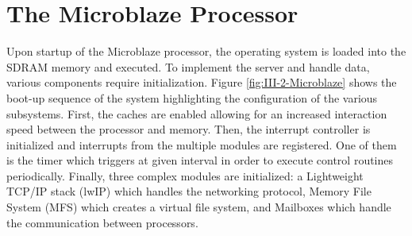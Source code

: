   \section{The Microblaze Processor}

    Upon startup of the Microblaze processor, the operating system is loaded into the SDRAM memory and executed. To implement the server and handle data, various components require initialization. Figure \ref{fig:III-2-Microblaze} shows the boot-up sequence of the system highlighting the configuration of the various subsystems. First, the caches are enabled allowing for an increased interaction speed between the processor and memory. Then, the interrupt controller is initialized and interrupts from the multiple modules are registered. One of them is the timer which triggers at given interval in order to execute control routines periodically. Finally, three complex modules are initialized: a Lightweight TCP/IP stack (lwIP) which handles the networking protocol, Memory File System (MFS) which creates a virtual file system, and Mailboxes which handle the communication between processors.

